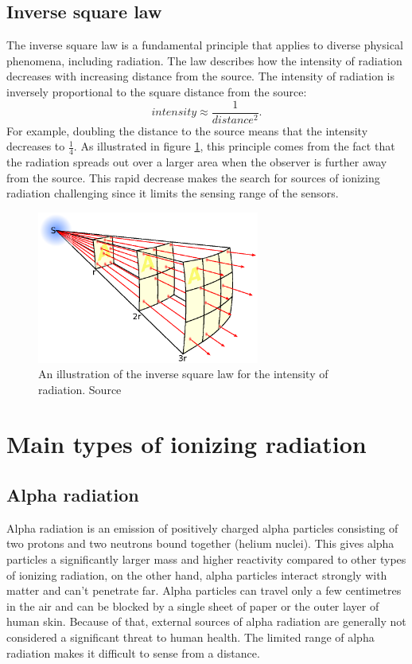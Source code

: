 \subsection{Inverse square law}%
The inverse square law is a fundamental principle that applies to diverse physical phenomena, including radiation.
The law describes how the intensity of radiation decreases with increasing distance from the source.
The intensity of radiation is inversely proportional to the square distance from the source:
\begin{equation}
  intensity \approx \frac{1}{distance^2}.
\end{equation}
For example, doubling the distance to the source means that the intensity decreases to $\frac{1}{4}$.
As illustrated in figure \ref{fig:islaw}, this principle comes from the fact that the radiation spreads out over a larger area when the observer is further away from the source.
This rapid decrease makes the search for sources of ionizing radiation challenging since it limits the sensing range of the sensors.

  \begin{figure}[!h]
    \centering
      \includegraphics[width=0.65\textwidth]{./fig/photos/Inverse_square_law.eps}
    \caption{An illustration of the inverse square law for the intensity of radiation. Source\protect\footnotemark }%
      \label{fig:islaw}
  \end{figure}
\section{Main types of ionizing radiation}
\subsection{Alpha radiation}
Alpha radiation is an emission of positively charged alpha particles consisting of two protons and two neutrons bound together (helium nuclei).
This gives alpha particles a significantly larger mass and higher reactivity compared to other types of ionizing radiation, on the other hand, alpha particles interact strongly with matter and can't penetrate far.
Alpha particles can travel only a few centimetres in the air and can be blocked by a single sheet of paper or the outer layer of human skin.
Because of that, external sources of alpha radiation are generally not considered a significant threat to human health.
The limited range of alpha radiation makes it difficult to sense from a distance.

